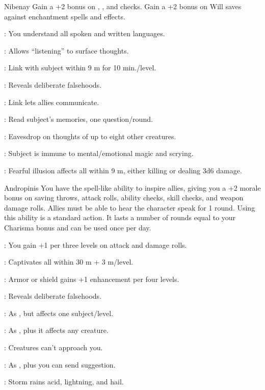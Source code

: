 {Nibenay}
{Gain a +2 bonus on , , and  checks. Gain a +2 bonus on Will saves against enchantment spells and effects.}
{
	\item {}: You understand all spoken and written languages.
	\item {}: Allows ``listening'' to surface thoughts.
	\item {}: Link with subject within 9 m for 10 min./level.
	\item {}: Reveals deliberate falsehoods.
	\item {}: Link lets allies communicate.
	\item {}: Read subject's memories, one question/round.
	\item {}: Eavesdrop on thoughts of up to eight other creatures.
	\item {}: Subject is immune to mental/emotional magic and scrying.
	\item {}: Fearful illusion affects all within 9 m, either killing or dealing 3d6 damage.
}

{Andropinis}
{You have the spell-like ability to inspire allies, giving you a +2 morale bonus on saving throws, attack rolls, ability checks, skill checks, and weapon damage rolls. Allies must be able to hear the character speak for 1 round. Using this ability is a standard action. It lasts a number of rounds equal to your Charisma bonus and can be used once per day.}
{
	\item {}: You gain +1 per three levels on attack and damage rolls.
	\item {}: Captivates all within 30 m + 3 m/level.
	\item {}: Armor or shield gains +1 enhancement per four levels.
	\item {}: Reveals deliberate falsehoods.
	\item {}: As , but affects one subject/level.
	\item {}: As , plus it affects any creature.
	\item {}: Creatures can't approach you.
	\item {}: As , plus you can send suggestion.
	\item {}: Storm rains acid, lightning, and hail.
}

